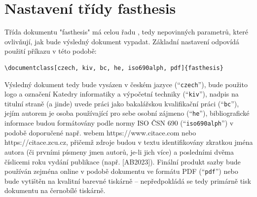 \documentclass[czech, bc, kiv, he, iso690alph]{fasthesis}
\begin{document}
\section{Nastavení třídy {\ttzfamily fasthesis}}
Třída dokumentu \filename"fasthesis" má celou řadu , tedy nepovinných parametrů, které ovlivňují, jak bude výsledný dokument vypadat. Základní nastavení odpovídá použití příkazu v této podobě:
\lstset{style=plainsrc}
\begin{lstlisting}
\documentclass[czech, kiv, bc, he, iso690alph, pdf]{fasthesis}
\end{lstlisting}
Výsledný dokument tedy bude vysázen v českém jazyce (``\verb"czech"''), bude použito logo a označení Katedry informatiky a výpočetní techniky (``\verb"kiv"''), nadpis na titulní straně (a jinde) uvede práci jako bakalářskou kvalifikační práci (``\verb"bc"''), jejím autorem je osoba používající pro sebe osobní zájmeno  (``\verb"he"''), bibliografické informace budou formátovány podle
normy ISO ČSN 690 (``\verb"iso690alph"'') v podobě doporučené např. webem {\ttzfamily\footnotesize https://www.citace.com} nebo {\ttzfamily\footnotesize https://citace.zcu.cz}, přičemž zdroje budou v textu identifikovány zkratkou jména autora (či prvními písmeny jmen autorů, je-li jich více) a posledními dvěma číslicemi roku vydání publikace (např. [AB2023]).
Finální produkt sazby bude používán zejména online v podobě dokumentu ve formátu PDF (``\verb"pdf"'') nebo bude vytištěn na kvalitní barevné tiskárně -- nepředpokládá se tedy primárně tisk dokumentu na černobílé tiskárně.
%
%
%
\end{document}
